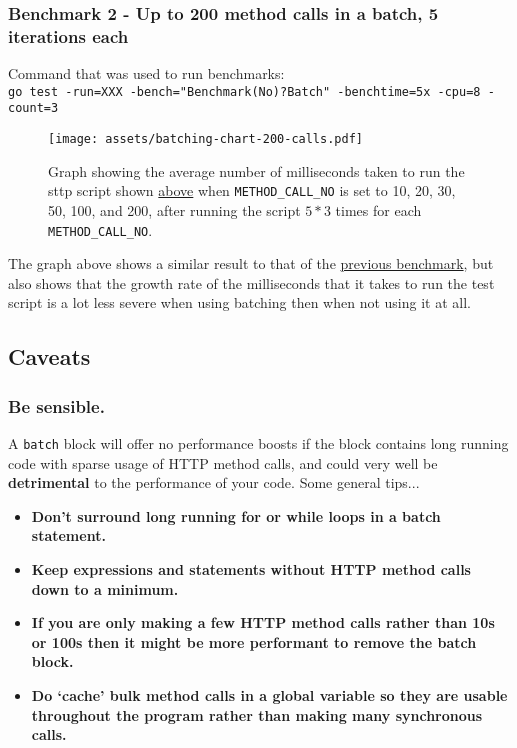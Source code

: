 \subsubsection{Benchmark 2 - Up to 200 method calls in a batch, 5 iterations each}
\label{sec:batching-benchmark-2}

\begin{center}
    Command that was used to run benchmarks:\\[0.5em]
    \verb|go test -run=XXX -bench="Benchmark(No)?Batch" -benchtime=5x -cpu=8 -count=3|
\end{center}

\begin{figure}[H]
    \centering
    \texttt{[image: assets/batching-chart-200-calls.pdf]}
    \cprotect\caption{Graph showing the average number of milliseconds taken to run the sttp script shown \hyperref[sec:batching-performance]{above} when \verb|METHOD_CALL_NO| is set to 10, 20, 30, 50, 100, and 200, after running the script $5 * 3$ times for each \verb|METHOD_CALL_NO|.}
\end{figure}

The graph above shows a similar result to that of the \hyperref[sec:batching-benchmark-1]{previous benchmark}, but also shows that the growth rate of the milliseconds that it takes to run the test script is a lot less severe when using batching then when not using it at all.

\subsection{Caveats}

\subsubsection{Be sensible.}

A \verb|batch| block will offer no performance boosts if the block contains long running code with sparse usage of HTTP method calls, and could very well be \textbf{detrimental} to the performance of your code. Some general tips...

\begin{itemize}
    \item \textbf{Don't surround long running for or while loops in a batch statement.}
    \item \textbf{Keep expressions and statements without HTTP method calls down to a minimum.}
    \item \textbf{If you are only making a few HTTP method calls rather than 10s or 100s then it might be more performant to remove the batch block.}
    \item \textbf{Do `cache' bulk method calls in a global variable so they are usable throughout the program rather than making many synchronous calls.}
\end{itemize}

